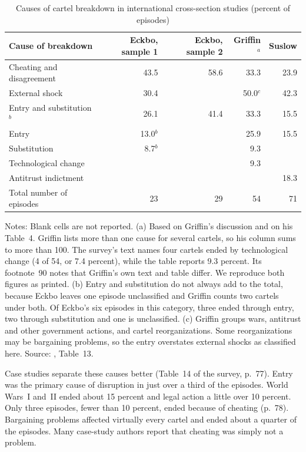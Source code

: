 \begin{table}[htbp]
\centering
\caption{Causes of cartel breakdown in international cross-section studies (percent of episodes)}\label{tab:12-ls-breakdown}
\footnotesize
\begin{tabular}{@{}l r r r r@{}}
\toprule
Cause of breakdown & Eckbo, sample 1 & Eckbo, sample 2 & Griffin$^{a}$ & Suslow\\
\midrule
Cheating and disagreement & 43.5 & 58.6 & 33.3 & 23.9\\
External shock & 30.4 & & 50.0$^{c}$ & 42.3\\
Entry and substitution$^{b}$ & 26.1 & 41.4 & 33.3 & 15.5\\
\quad Entry & 13.0$^{b}$ & & 25.9 & 15.5\\
\quad Substitution & 8.7$^{b}$ & & 9.3 & \\
Technological change & & & 9.3 & \\
Antitrust indictment & & & & 18.3\\
\midrule
Total number of episodes & 23 & 29 & 54 & 71\\
\bottomrule
\end{tabular}

\smallskip
\begin{minipage}{0.92\textwidth}\footnotesize
Notes: Blank cells are not reported. (a) Based on Griffin's discussion and on his Table~4. Griffin lists more than one
cause for several cartels, so his column sums to more than 100. The survey's text names four cartels ended by
technological change (4 of 54, or 7.4 percent), while the table reports 9.3 percent. Its footnote~90 notes that
Griffin's own text and table differ. We reproduce both figures as printed. (b) Entry and substitution do not always add to the
total, because Eckbo leaves one episode unclassified and Griffin counts two cartels under both. Of Eckbo's six
episodes in this category, three ended through entry, two through substitution and one is unclassified. (c) Griffin
groups wars, antitrust and other government actions, and cartel reorganizations. Some reorganizations may be
bargaining problems, so the entry overstates external shocks as classified here.
Source: \citet{LevensteinSuslow2006}, Table~13.
\end{minipage}
\end{table}

Case studies separate these causes better (Table~14 of the survey, p.~77). Entry was the primary cause of
disruption in just over a third of the episodes. World Wars~I and~II ended about 15 percent and legal action a little
over 10 percent. Only three episodes, fewer than 10 percent, ended because of cheating (p.~78). Bargaining problems
affected virtually every cartel and ended about a quarter of the episodes. Many case-study authors report that
cheating was simply not a problem.


